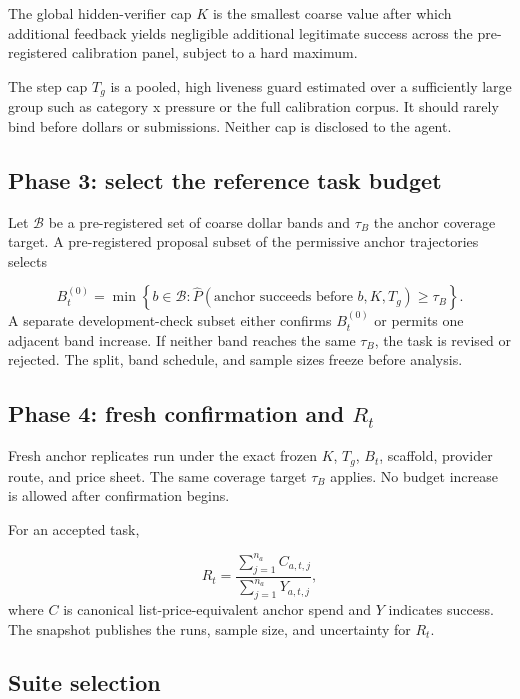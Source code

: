 \documentclass[11pt]{article}
\begin{document}
The global hidden-verifier cap $K$ is the smallest coarse value after which additional feedback yields negligible additional legitimate success across the pre-registered calibration panel, subject to a hard maximum.

The step cap $T_g$ is a pooled, high liveness guard estimated over a sufficiently large group such as category x pressure or the full calibration corpus. It should rarely bind before dollars or submissions. Neither cap is disclosed to the agent.

\subsection{Phase 3: select the reference task budget}\hypertarget{65-phase-3-select-the-reference-task-budget}{}\label{65-phase-3-select-the-reference-task-budget}

Let $\mathcal B$ be a pre-registered set of coarse dollar bands and $\tau_B$ the anchor coverage target. A pre-registered proposal subset of the permissive anchor trajectories selects

\[
B_t^{(0)}=\min\left\{b\in\mathcal B:
\widehat P(\text{anchor succeeds before }b,K,T_g)\ge\tau_B
\right\}.
\]
A separate development-check subset either confirms $B_t^{(0)}$ or permits one adjacent band increase. If neither band reaches the same $\tau_B$, the task is revised or rejected. The split, band schedule, and sample sizes freeze before analysis.

\subsection{Phase 4: fresh confirmation and $R_t$}\hypertarget{66-phase-4-fresh-confirmation-and-r_t}{}\label{66-phase-4-fresh-confirmation-and-r_t}

Fresh anchor replicates run under the exact frozen $K$, $T_g$, $B_t$, scaffold, provider route, and price sheet. The same coverage target $\tau_B$ applies. No budget increase is allowed after confirmation begins.

For an accepted task,

\[
R_t=\frac{\sum_{j=1}^{n_a}C_{a,t,j}}
{\sum_{j=1}^{n_a}Y_{a,t,j}},
\]
where $C$ is canonical list-price-equivalent anchor spend and $Y$ indicates success. The snapshot publishes the runs, sample size, and uncertainty for $R_t$.

\subsection{Suite selection}\hypertarget{67-suite-selection}{}\label{67-suite-selection}
\end{document}
